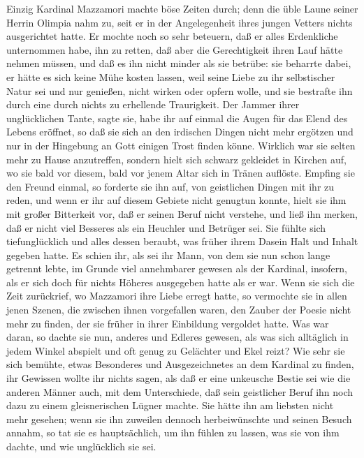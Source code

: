 \pagenum{[80]}Einzig Kardinal Mazzamori machte böse Zeiten durch;
denn die üble Laune seiner Herrin Olimpia nahm zu, seit er in der
Angelegenheit ihres jungen Vetters nichts ausgerichtet hatte. Er
mochte noch so sehr beteuern, daß er alles Erdenkliche unternommen
habe, ihn zu retten, daß aber die Gerechtigkeit ihren Lauf hätte
nehmen müssen, und daß es ihn nicht minder als sie betrübe: sie
beharrte dabei, er hätte es sich keine Mühe kosten lassen, weil
seine Liebe zu ihr selbstischer Natur sei und nur genießen, nicht
wirken oder opfern wolle, und sie bestrafte ihn durch eine durch
nichts zu erhellende Traurigkeit. Der Jammer ihrer unglücklichen
Tante, sagte sie, habe ihr auf einmal die Augen für das Elend des
Lebens eröffnet, so daß sie sich an den irdischen Dingen nicht mehr
ergötzen und nur in der Hingebung an Gott einigen Trost finden
könne. Wirklich war sie selten mehr zu Hause anzutreffen, sondern
hielt sich schwarz gekleidet in Kirchen auf, wo sie bald vor
diesem, bald vor jenem Altar sich in Tränen auflöste. Empfing sie
den Freund einmal, so forderte sie ihn auf, von geistlichen Dingen
mit ihr zu reden, und wenn er ihr auf diesem Gebiete nicht genugtun
konnte, hielt sie ihm mit großer Bitterkeit vor, daß er seinen
Beruf nicht verstehe, und ließ ihn merken, daß er nicht viel
Besseres als ein Heuchler und Betrüger sei. Sie fühlte sich
tiefunglücklich und alles dessen beraubt, was früher ihrem Dasein
Halt und Inhalt gegeben hatte. Es schien ihr, als sei ihr Mann, von
dem sie nun schon lange getrennt lebte, im Grunde viel annehmbarer
gewesen als der Kardinal, insofern, als er sich doch für nichts
Höheres ausgegeben hatte als er war. Wenn sie sich die Zeit
zurückrief, wo Mazzamori ihre Liebe erregt hatte, so vermochte sie
in allen jenen Szenen, die zwischen\pagenum{[81]} ihnen
vorgefallen waren, den Zauber der Poesie nicht mehr zu finden, der
sie früher in ihrer Einbildung vergoldet hatte. Was war daran, so
dachte sie nun, anderes und Edleres gewesen, als was sich
alltäglich in jedem Winkel abspielt und oft genug zu Gelächter und
Ekel reizt? Wie sehr sie sich bemühte, etwas Besonderes und
Ausgezeichnetes an dem Kardinal zu finden, ihr Gewissen wollte ihr
nichts sagen, als daß er eine unkeusche Bestie sei wie die anderen
Männer auch, mit dem Unterschiede, daß sein geistlicher Beruf ihn
noch dazu zu einem gleisnerischen Lügner machte. Sie hätte ihn am
liebsten nicht mehr gesehen; wenn sie ihn zuweilen dennoch
herbeiwünschte und seinen Besuch annahm, so tat sie es
hauptsächlich, um ihn fühlen zu lassen, was sie von ihm dachte, und
wie unglücklich sie sei.

